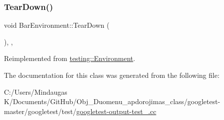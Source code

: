 \subsubsection{\texorpdfstring{TearDown()}{TearDown()}\hspace{0.1cm}{\footnotesize\ttfamily [3/3]}}
{\footnotesize\ttfamily void Bar\+Environment\+::\+Tear\+Down (\begin{DoxyParamCaption}{ }\end{DoxyParamCaption})\hspace{0.3cm}{\ttfamily [inline]}, {\ttfamily [override]}, {\ttfamily [virtual]}}



Reimplemented from \mbox{\hyperlink{classtesting_1_1_environment_a039bdaa705c46b9b88234cf4d3bb6254}{testing\+::\+Environment}}.



The documentation for this class was generated from the following file\+:\begin{DoxyCompactItemize}
\item 
C\+:/\+Users/\+Mindaugas K/\+Documents/\+Git\+Hub/\+Obj\+\_\+\+Duomenu\+\_\+apdorojimas\+\_\+class/googletest-\/master/googletest/test/\mbox{\hyperlink{googletest-master_2googletest_2test_2googletest-output-test___8cc}{googletest-\/output-\/test\+\_\+.\+cc}}\end{DoxyCompactItemize}
